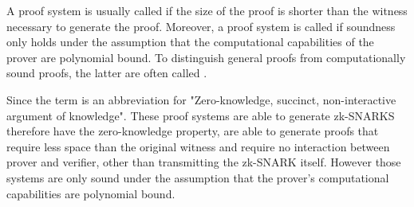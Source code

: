 A proof system is usually called  if the size of the proof is shorter than the witness necessary to generate the proof. Moreover, a proof system is called  if soundness only holds under the assumption that the computational capabilities of the prover are polynomial bound. To distinguish general proofs from computationally sound proofs, the latter are often called .

Since the term  is an abbreviation for "Zero-knowledge, succinct, non-interactive argument of knowledge". These proof systems are able to generate zk-SNARKS therefore have the zero-knowledge property, are able to generate proofs that require less space than the original witness and require no interaction between prover and verifier, other than transmitting the zk-SNARK itself. However those systems are only sound under the assumption that the prover's computational capabilities are polynomial bound.

